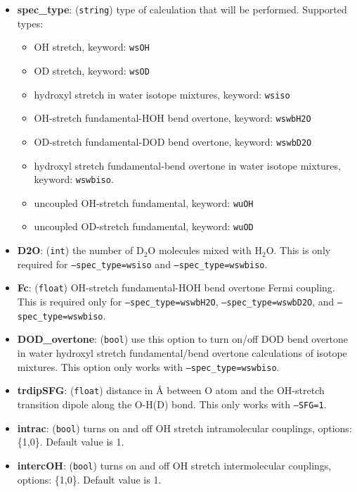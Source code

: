 \documentclass{article}
\begin{document}
\begin{itemize}
\item \textbf{spec\_type}: (\texttt{string}) type of calculation that will be performed. Supported types:
\begin{itemize}
\item OH stretch, keyword: \texttt{wsOH}
\item OD stretch, keyword: \texttt{wsOD}
\item hydroxyl stretch in water isotope mixtures, keyword: \texttt{wsiso}
\item OH-stretch fundamental-HOH bend overtone, keyword: \texttt{wswbH2O}
\item OD-stretch fundamental-DOD bend overtone, keyword: \texttt{wswbD2O}
\item hydroxyl stretch fundamental-bend overtone in water isotope mixtures, keyword: \texttt{wswbiso}.
\item uncoupled OH-stretch fundamental, keyword: \texttt{wuOH}
\item uncoupled OD-stretch fundamental, keyword: \texttt{wuOD}
\end{itemize}

\item \textbf{D2O}: (\texttt{int}) the number of D$_2$O molecules mixed with H$_2$O. This is only required for \texttt{--spec\_type=wsiso}
and  \texttt{--spec\_type=wswbiso}.

\item \textbf{Fc}: (\texttt{float}) OH-stretch fundamental-HOH bend overtone Fermi coupling. This is  required only for \texttt{--spec\_type=wswbH2O},
\texttt{--spec\_type=wswbD2O}, and \texttt{--spec\_type=wswbiso}.

\item \textbf{DOD\_overtone}: (\texttt{bool}) use this option to turn on/off DOD bend overtone in water hydroxyl stretch fundamental/bend overtone
calculations of isotope mixtures. This option only works with \texttt{--spec\_type=wswbiso}.

\item \textbf{trdipSFG}: (\texttt{float}) distance in \AA{} between O atom and the
OH-stretch transition dipole along the O-H(D) bond. This only works with  
\texttt{--SFG=1}.

\item \textbf{intrac}: (\texttt{bool}) turns on and off OH stretch intramolecular couplings, options: \{1,0\}. Default value is 1.

\item \textbf{intercOH}: (\texttt{bool}) turns on and off OH stretch intermolecular couplings, options: \{1,0\}. Default value is 1.

\end{itemize}
\end{document}
